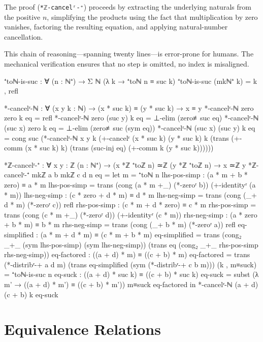 \documentclass[11pt,a4paper]{book}
\begin{document}
The proof (\texttt{*ℤ-cancelʳ-⁺}) proceeds by extracting the underlying naturals from 
the positive $n$, simplifying the products using the fact that multiplication by zero 
vanishes, factoring the resulting equation, and applying natural-number cancellation.

This chain of reasoning—spanning twenty lines—is error-prone for humans. The mechanical 
verification ensures that no step is omitted, no index is misaligned.

\begin{code}
⁺toℕ-is-suc : ∀ (n : ℕ⁺) → Σ ℕ (λ k → ⁺toℕ n ≡ suc k)
⁺toℕ-is-suc (mkℕ⁺ k) = k , refl

*-cancelʳ-ℕ : ∀ (x y k : ℕ) → (x * suc k) ≡ (y * suc k) → x ≡ y
*-cancelʳ-ℕ zero zero k eq = refl
*-cancelʳ-ℕ zero (suc y) k eq = ⊥-elim (zero≢suc eq)
*-cancelʳ-ℕ (suc x) zero k eq = ⊥-elim (zero≢suc (sym eq))
*-cancelʳ-ℕ (suc x) (suc y) k eq = 
  cong suc (*-cancelʳ-ℕ x y k (+-cancelʳ (x * suc k) (y * suc k) k 
    (trans (+-comm (x * suc k) k) (trans (suc-inj eq) (+-comm k (y * suc k))))))

*ℤ-cancelʳ-⁺ : ∀ {x y : ℤ} (n : ℕ⁺) → (x *ℤ ⁺toℤ n) ≃ℤ (y *ℤ ⁺toℤ n) → x ≃ℤ y
*ℤ-cancelʳ-⁺ {mkℤ a b} {mkℤ c d} n eq = 
  let m = ⁺toℕ n
      lhs-pos-simp : (a * m + b * zero) ≡ a * m
      lhs-pos-simp = trans (cong (a * m +_) (*-zeroʳ b)) (+-identityʳ (a * m))
      lhs-neg-simp : (c * zero + d * m) ≡ d * m
      lhs-neg-simp = trans (cong (_+ d * m) (*-zeroʳ c)) refl
      rhs-pos-simp : (c * m + d * zero) ≡ c * m
      rhs-pos-simp = trans (cong (c * m +_) (*-zeroʳ d)) (+-identityʳ (c * m))
      rhs-neg-simp : (a * zero + b * m) ≡ b * m
      rhs-neg-simp = trans (cong (_+ b * m) (*-zeroʳ a)) refl
      eq-simplified : (a * m + d * m) ≡ (c * m + b * m)
      eq-simplified = trans (cong₂ _+_ (sym lhs-pos-simp) (sym lhs-neg-simp))
                      (trans eq (cong₂ _+_ rhs-pos-simp rhs-neg-simp))
      eq-factored : ((a + d) * m) ≡ ((c + b) * m)
      eq-factored = trans (*-distribʳ-+ a d m) 
                    (trans eq-simplified (sym (*-distribʳ-+ c b m)))
      (k , m≡suck) = ⁺toℕ-is-suc n
      eq-suck : ((a + d) * suc k) ≡ ((c + b) * suc k)
      eq-suck = subst (λ m' → ((a + d) * m') ≡ ((c + b) * m')) m≡suck eq-factored
  in *-cancelʳ-ℕ (a + d) (c + b) k eq-suck
\end{code}

\section{Equivalence Relations}
\end{document}
